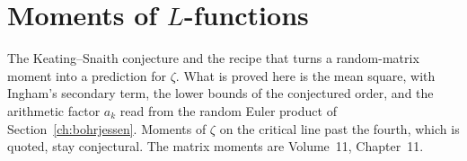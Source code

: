 \chapter{Moments of \texorpdfstring{$L$}{L}-functions}\label{ch:oc-moments}\label{ch:moments}

The Keating--Snaith conjecture and the recipe that turns a random-matrix moment into a prediction for $\zeta$. What is proved here is the mean square, with Ingham's secondary term, the lower bounds of the conjectured order, and the arithmetic factor $a_k$ read from the random Euler product of Section~\ref{ch:bohrjessen}. Moments of $\zeta$ on the critical line past the fourth, which is quoted, stay conjectural. The matrix moments are Volume~11, Chapter~11.


